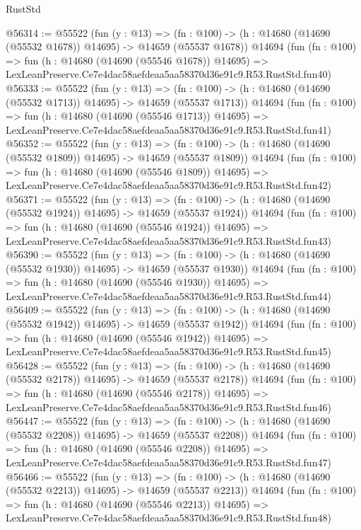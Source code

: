 \begin{lexlean}{RustStd}
\begin{coremodule}
@56314 := @55522
    (fun (y : @13) =>
    (fn : @100) -> (h : @14680 (@14690 (@55532 @1678)) @14695) -> @14659 (@55537 @1678))
    @14694
    (fun (fn : @100) =>
    fun (h : @14680 (@14690 (@55546 @1678)) @14695) =>
    LexLeanPreserve.Ce7e4dac58aefdeaa5aa58370d36e91c9.R53.RustStd.fun40)
@56333 := @55522
    (fun (y : @13) =>
    (fn : @100) -> (h : @14680 (@14690 (@55532 @1713)) @14695) -> @14659 (@55537 @1713))
    @14694
    (fun (fn : @100) =>
    fun (h : @14680 (@14690 (@55546 @1713)) @14695) =>
    LexLeanPreserve.Ce7e4dac58aefdeaa5aa58370d36e91c9.R53.RustStd.fun41)
@56352 := @55522
    (fun (y : @13) =>
    (fn : @100) -> (h : @14680 (@14690 (@55532 @1809)) @14695) -> @14659 (@55537 @1809))
    @14694
    (fun (fn : @100) =>
    fun (h : @14680 (@14690 (@55546 @1809)) @14695) =>
    LexLeanPreserve.Ce7e4dac58aefdeaa5aa58370d36e91c9.R53.RustStd.fun42)
@56371 := @55522
    (fun (y : @13) =>
    (fn : @100) -> (h : @14680 (@14690 (@55532 @1924)) @14695) -> @14659 (@55537 @1924))
    @14694
    (fun (fn : @100) =>
    fun (h : @14680 (@14690 (@55546 @1924)) @14695) =>
    LexLeanPreserve.Ce7e4dac58aefdeaa5aa58370d36e91c9.R53.RustStd.fun43)
@56390 := @55522
    (fun (y : @13) =>
    (fn : @100) -> (h : @14680 (@14690 (@55532 @1930)) @14695) -> @14659 (@55537 @1930))
    @14694
    (fun (fn : @100) =>
    fun (h : @14680 (@14690 (@55546 @1930)) @14695) =>
    LexLeanPreserve.Ce7e4dac58aefdeaa5aa58370d36e91c9.R53.RustStd.fun44)
@56409 := @55522
    (fun (y : @13) =>
    (fn : @100) -> (h : @14680 (@14690 (@55532 @1942)) @14695) -> @14659 (@55537 @1942))
    @14694
    (fun (fn : @100) =>
    fun (h : @14680 (@14690 (@55546 @1942)) @14695) =>
    LexLeanPreserve.Ce7e4dac58aefdeaa5aa58370d36e91c9.R53.RustStd.fun45)
@56428 := @55522
    (fun (y : @13) =>
    (fn : @100) -> (h : @14680 (@14690 (@55532 @2178)) @14695) -> @14659 (@55537 @2178))
    @14694
    (fun (fn : @100) =>
    fun (h : @14680 (@14690 (@55546 @2178)) @14695) =>
    LexLeanPreserve.Ce7e4dac58aefdeaa5aa58370d36e91c9.R53.RustStd.fun46)
@56447 := @55522
    (fun (y : @13) =>
    (fn : @100) -> (h : @14680 (@14690 (@55532 @2208)) @14695) -> @14659 (@55537 @2208))
    @14694
    (fun (fn : @100) =>
    fun (h : @14680 (@14690 (@55546 @2208)) @14695) =>
    LexLeanPreserve.Ce7e4dac58aefdeaa5aa58370d36e91c9.R53.RustStd.fun47)
@56466 := @55522
    (fun (y : @13) =>
    (fn : @100) -> (h : @14680 (@14690 (@55532 @2213)) @14695) -> @14659 (@55537 @2213))
    @14694
    (fun (fn : @100) =>
    fun (h : @14680 (@14690 (@55546 @2213)) @14695) =>
    LexLeanPreserve.Ce7e4dac58aefdeaa5aa58370d36e91c9.R53.RustStd.fun48)

\end{coremodule}
\end{lexlean}

